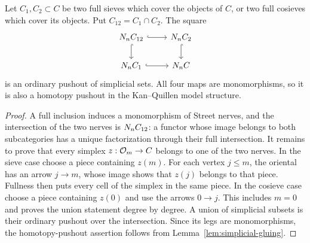 \begin{lemma}\label{lem:nerve-cover}
Let $C_1,C_2\subset C$ be two full sieves which cover the objects of
$C$, or two full cosieves which cover its objects.  Put
$C_{12}=C_1\cap C_2$.  The square
\[
\begin{tikzcd}
 \Street C_{12} \ar[r,hook] \ar[d,hook] & \Street C_2 \ar[d,hook] \\
 \Street C_1 \ar[r,hook] & \Street C
\end{tikzcd}
\]
is an ordinary pushout of simplicial sets.  All four maps are
monomorphisms, so it is also a homotopy pushout in the Kan--Quillen
model structure.
\end{lemma}

\begin{proof}
A full inclusion induces a monomorphism of Street nerves, and the
intersection of the two nerves is $N_n C_{12}$: a functor whose
image belongs to both subcategories has a unique factorization through
their full intersection.  It remains to prove that every simplex
$z:\mathcal O_{m}\to C$ belongs to one of the two nerves.  In the sieve
case choose a piece containing $z(m)$.  For each vertex $j\leq m$,
the oriental has an arrow $j\to m$, whose image shows that $z(j)$
belongs to that piece.  Fullness then puts every cell of the simplex
in the same piece.  In the cosieve case choose a piece containing
$z(0)$ and use the arrows $0\to j$.  This includes $m=0$ and proves
the union statement degree by degree.  A union of simplicial subsets
is their ordinary pushout over the intersection.  Since its legs
are monomorphisms, the homotopy-pushout assertion follows from
Lemma~\ref{lem:simplicial-gluing}.
\end{proof}
